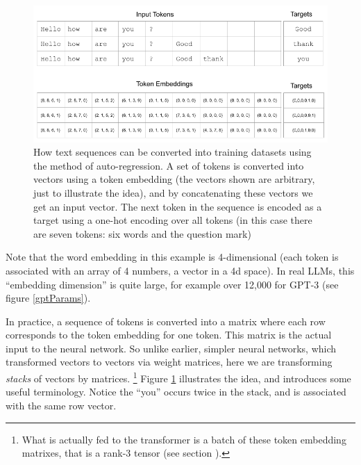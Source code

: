 \begin{figure}[h]
\centering
\includegraphics[scale=.45]{./images/contextWindow.png}
\caption[Jeff Yoshimi]{How text sequences can be converted into training datasets using the method of auto-regression. A set of tokens is converted into vectors using a token embedding (the vectors shown are arbitrary, just to illustrate the idea), and by concatenating these vectors we get an input vector. The next token in the sequence is encoded as a target using a one-hot encoding over all tokens (in this case there are seven tokens: six words and the question mark)}
\label{nextWordPrediction}
\end{figure}

Note that the word embedding in this example is 4-dimensional (each token is associated with an array of 4 numbers, a vector in a 4d space). In real LLMs, this ``embedding dimension'' is quite large, for example over 12,000 for GPT-3 (see figure \ref{gptParams}). 

In practice, a sequence of tokens is converted into a matrix where each row corresponds to the token embedding for one token. This matrix is the actual input to the neural network. So unlike earlier, simpler neural networks, which transformed vectors to vectors via weight matrices, here we are transforming \emph{stacks} of vectors by matrices. \footnote{What is actually fed to the transformer is a batch of these token embedding matrixes, that is a rank-3 tensor (see section ).}  Figure \ref{nextWordPrediction} illustrates the idea, and introduces some useful terminology. Notice the ``you'' occurs twice in the stack, and is associated with the same row vector.

